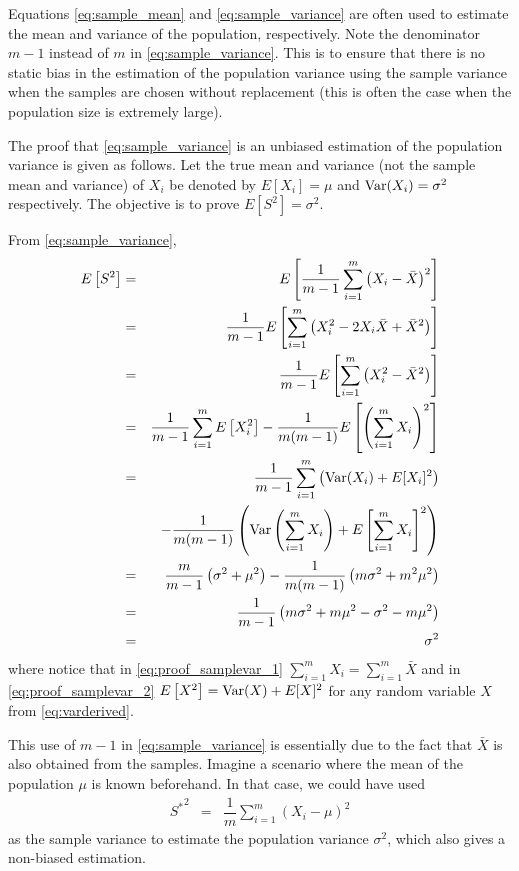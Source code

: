 Equations \eqref{eq:sample_mean} and \eqref{eq:sample_variance} are often used to estimate the mean and variance of the population, respectively. Note the denominator $m-1$ instead of $m$ in \eqref{eq:sample_variance}. This is to ensure that there is no static bias in the estimation of the population variance using the sample variance when the samples are chosen without replacement (this is often the case when the population size is extremely large).

The proof that \eqref{eq:sample_variance} is an unbiased estimation of the population variance is given as follows. Let the true mean and variance (not the sample mean and variance) of $X_i$ be denoted by $E[X_i] = \mu$ and $\textup{Var}(X_i)=\sigma^2$ respectively. The objective is to prove $E\left[S^2\right]=\sigma^2$.

From \eqref{eq:sample_variance},
\begin{eqnarray}
	E\left[S^2\right] &=& E\left[\dfrac{1}{m-1}\sum_{i=1}^{m}\left(X_i - \bar{X}\right)^2\right] \nonumber \\
	&=& \dfrac{1}{m-1} E\left[\sum_{i=1}^{m}\left(X_i^2 - 2X_i\bar{X} + \bar{X}^2\right)\right] \label{eq:proof_samplevar_1} \\
	&=& \dfrac{1}{m-1} E\left[\sum_{i=1}^{m}\left(X_i^2 - \bar{X}^2\right)\right] \nonumber \\
	&=& \dfrac{1}{m-1}\sum_{i=1}^{m} E\left[X_i^2\right] - \dfrac{1}{m(m-1)}E\left[\left(\sum_{i=1}^{m}X_i\right)^2\right] \label{eq:proof_samplevar_2} \\
	&=& \dfrac{1}{m-1}\sum_{i=1}^{m} \left(\textup{Var}(X_i) + E[X_i]^2\right) \nonumber \\ && -  \dfrac{1}{m(m-1)}\left(\textup{Var}\left(\sum_{i=1}^{m}X_i\right) + E\left[\sum_{i=1}^{m}X_i\right]^2\right) \nonumber \\
	&=& \dfrac{m}{m-1}\left(\sigma^2 + \mu^2\right) - \dfrac{1}{m(m-1)}\left(m\sigma^2 + m^2\mu^2\right) \nonumber \\
	&=& \dfrac{1}{m-1}\left(m\sigma^2 + m\mu^2 - \sigma^2 - m\mu^2\right) \nonumber \\
	&=& \sigma^2 \nonumber
\end{eqnarray}
where notice that in \eqref{eq:proof_samplevar_1} $\sum_{i=1}^{m}X_i = \sum_{i=1}^{m}\bar{X}$ and in \eqref{eq:proof_samplevar_2} $E\left[X^2\right] = \textup{Var}(X) + E[X]^2$ for any random variable $X$ from \eqref{eq:varderived}.

This use of $m-1$ in \eqref{eq:sample_variance} is essentially due to the fact that $\bar{X}$ is also obtained from the samples. Imagine a scenario where the mean of the population $\mu$ is known beforehand. In that case, we could have used
\begin{eqnarray}
	{S^*}^2 &=& \dfrac{1}{m}\sum_{i=1}^{m}\left(X_i - \mu\right)^2 \nonumber
\end{eqnarray}
as the sample variance to estimate the population variance $\sigma^2$, which also gives a non-biased estimation.

